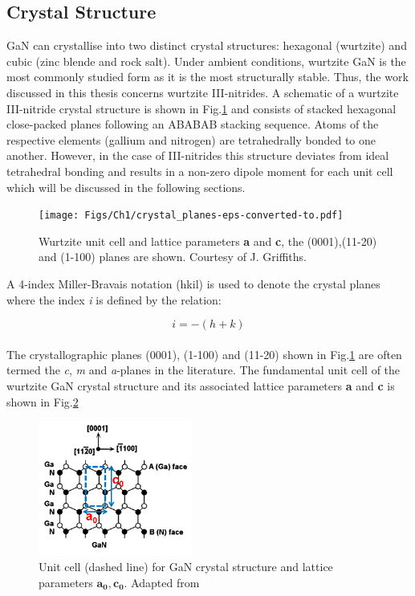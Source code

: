 \subsection{Crystal Structure}
\label{section1.1.1}

GaN can crystallise into two distinct crystal structures: hexagonal (wurtzite) and cubic (zinc blende and rock salt). Under ambient conditions, wurtzite GaN is the most commonly studied form as it is the most structurally stable. Thus, the work discussed in this thesis concerns wurtzite III-nitrides. A schematic of a wurtzite III-nitride crystal structure is shown in Fig.\ref{1.1} and consists of stacked hexagonal close-packed planes following an ABABAB stacking sequence. Atoms of the respective elements (gallium and nitrogen) are tetrahedrally bonded to one another. However, in the case of III-nitrides this structure deviates from ideal tetrahedral bonding and results in a non-zero dipole moment for each unit cell which will be discussed in the following sections.

\begin{figure}[h]
	\centering
	\texttt{[image: Figs/Ch1/crystal\_planes-eps-converted-to.pdf]}
	\caption {Wurtzite unit cell and lattice parameters \textbf{a} and \textbf{c}, the (0001),(11-20) and (1-100) planes are shown. Courtesy of J. Griffiths.}
	\label{1.1}
\end{figure}
\FloatBarrier

A 4-index Miller-Bravais notation (hkil) is used to denote the crystal planes where the index {\it i} is defined by the relation:

\begin{equation}
 i = -(h+k)
 \end{equation}
\\
 
The crystallographic planes (0001), (1-100) and (11-20) shown in Fig.\ref{1.1} are often termed the {\it c}, {\it m} and {\it a}-planes in the literature. The fundamental unit cell of the wurtzite GaN crystal structure and its associated lattice parameters \textbf{a} and \textbf{c} is shown in Fig.\ref{1.2}

\begin{figure}[h]
	\centering
	\includegraphics[width=0.45\textwidth]{Figs/Ch1/unit_cell.png}
	\caption {Unit cell (dashed line) for GaN crystal structure and lattice parameters $\mathbf{a_{0}},\mathbf{c_{0}}$. Adapted from \cite{Yu1999}}
	\label{1.2}
\end{figure}
\FloatBarrier


